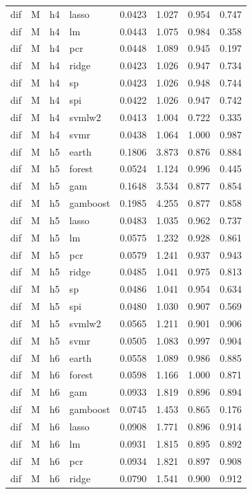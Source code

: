 \begin{ThreePartTable}
\begin{longtable}[t]{llclcccc}
dif & M & h4 & lasso & 0.0423 & 1.027 & 0.954 & 0.747\\
dif & M & h4 & lm & 0.0443 & 1.075 & 0.984 & 0.358\\
dif & M & h4 & pcr & 0.0448 & 1.089 & 0.945 & 0.197\\
dif & M & h4 & ridge & 0.0423 & 1.026 & 0.947 & 0.734\\
dif & M & h4 & sp & 0.0423 & 1.026 & 0.948 & 0.744\\
dif & M & h4 & spi & 0.0422 & 1.026 & 0.947 & 0.742\\
dif & M & h4 & svmlw2 & 0.0413 & 1.004 & 0.722 & 0.335\\
dif & M & h4 & svmr & 0.0438 & 1.064 & 1.000 & 0.987\\
\addlinespace
dif & M & h5 & earth & 0.1806 & 3.873 & 0.876 & 0.884\\
dif & M & h5 & forest & 0.0524 & 1.124 & 0.996 & 0.445\\
dif & M & h5 & gam & 0.1648 & 3.534 & 0.877 & 0.854\\
dif & M & h5 & gamboost & 0.1985 & 4.255 & 0.877 & 0.858\\
dif & M & h5 & lasso & 0.0483 & 1.035 & 0.962 & 0.737\\
dif & M & h5 & lm & 0.0575 & 1.232 & 0.928 & 0.861\\
dif & M & h5 & pcr & 0.0579 & 1.241 & 0.937 & 0.943\\
dif & M & h5 & ridge & 0.0485 & 1.041 & 0.975 & 0.813\\
dif & M & h5 & sp & 0.0486 & 1.041 & 0.954 & 0.634\\
dif & M & h5 & spi & 0.0480 & 1.030 & 0.907 & 0.569\\
dif & M & h5 & svmlw2 & 0.0565 & 1.211 & 0.901 & 0.906\\
dif & M & h5 & svmr & 0.0505 & 1.083 & 0.997 & 0.904\\
\addlinespace
dif & M & h6 & earth & 0.0558 & 1.089 & 0.986 & 0.885\\
dif & M & h6 & forest & 0.0598 & 1.166 & 1.000 & 0.871\\
dif & M & h6 & gam & 0.0933 & 1.819 & 0.896 & 0.894\\
dif & M & h6 & gamboost & 0.0745 & 1.453 & 0.865 & 0.176\\
dif & M & h6 & lasso & 0.0908 & 1.771 & 0.896 & 0.914\\
dif & M & h6 & lm & 0.0931 & 1.815 & 0.895 & 0.892\\
dif & M & h6 & pcr & 0.0934 & 1.821 & 0.897 & 0.908\\
dif & M & h6 & ridge & 0.0790 & 1.541 & 0.900 & 0.912\\

\end{longtable}
\end{ThreePartTable}
